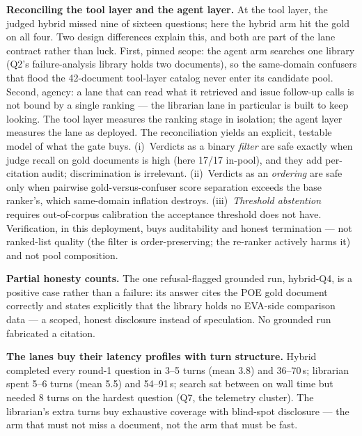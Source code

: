 \textbf{Reconciling the tool layer and the agent layer.} At the tool layer,
the judged hybrid missed nine of sixteen questions; here the hybrid arm hit
the gold on all four. Two design differences explain this, and both are
part of the lane contract rather than luck. First, pinned scope: the agent
arm searches one library (Q2's failure-analysis library holds two
documents), so the same-domain confusers that flood the 42-document
tool-layer catalog never enter its candidate pool. Second, agency: a lane
that can read what it retrieved and issue follow-up calls is not bound by a
single ranking --- the librarian lane in particular is built to keep
looking. The tool layer measures the ranking stage in isolation; the agent
layer measures the lane as deployed. The reconciliation yields an
explicit, testable model of what the gate buys. (i)~Verdicts as a binary
\emph{filter} are safe exactly when judge recall on gold documents is high
(here 17/17 in-pool), and they add per-citation audit; discrimination is
irrelevant. (ii)~Verdicts as an \emph{ordering} are safe only when
pairwise gold-versus-confuser score separation exceeds the base ranker's,
which same-domain inflation destroys. (iii)~\emph{Threshold abstention}
requires out-of-corpus calibration the acceptance threshold does not have.
Verification, in this deployment, buys auditability and honest termination
--- not ranked-list quality (the filter is order-preserving; the re-ranker
actively harms it) and not pool composition.

\textbf{Partial honesty counts.} The one refusal-flagged grounded run,
hybrid-Q4, is a positive case rather than a failure: its answer cites the
POE gold document correctly and states explicitly that the library holds no
EVA-side comparison data --- a scoped, honest disclosure instead of
speculation. No grounded run fabricated a citation.

\textbf{The lanes buy their latency profiles with turn structure.} Hybrid
completed every round-1 question in 3--5 turns (mean 3.8) and 36--70\,s;
librarian
spent 5--6 turns (mean 5.5) and 54--91\,s; search sat between on wall time
but needed 8 turns on the hardest question (Q7, the telemetry cluster).
The librarian's extra turns buy exhaustive coverage with blind-spot
disclosure --- the arm that must not miss a document, not the arm that
must be fast.

